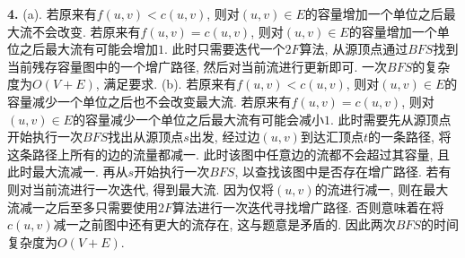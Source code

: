 \documentclass{article}
\begin{document}
	\begin{solution}\textnormal{\textbf{4.}}
		(a). 若原来有$f(u, v) < c(u, v)$, 则对$(u, v) \in E$的容量增加一个单位之后最大流不会改变.\newline
		若原来有$f(u, v) = c(u, v)$, 则对$(u, v) \in E$的容量增加一个单位之后最大流有可能会增加$1$. 此时只需要迭代一个$2F$算法,
		从源顶点通过$BFS$找到当前残存容量图中的一个增广路径, 然后对当前流进行更新即可. 一次$BFS$的复杂度为$O(V + E)$, 满足要求.\newline
		(b). 若原来有$f(u, v) < c(u, v)$, 则对$(u, v) \in E$的容量减少一个单位之后也不会改变最大流.\newline
		若原来有$f(u, v) = c(u, v)$, 则对$(u, v) \in E$的容量减少一个单位之后最大流有可能会减小$1$.\newline
		此时需要先从源顶点开始执行一次$BFS$找出从源顶点$s$出发, 经过边$(u, v)$到达汇顶点$t$的一条路径, 将这条路径上所有的边的流量都减一.\newline
		此时该图中任意边的流都不会超过其容量, 且此时最大流减一.\newline
		再从$s$开始执行一次$BFS$, 以查找该图中是否存在增广路径. 若有则对当前流进行一次迭代, 得到最大流.\newline
		因为仅将$(u, v)$的流进行减一, 则在最大流减一之后至多只需要使用$2F$算法进行一次迭代寻找增广路径. 否则意味着在将$c(u, v)$减一之前图中还有更大的流存在, 这与题意是矛盾的.\newline
		因此两次$BFS$的时间复杂度为$O(V + E)$.
	\end{solution}
\end{document}
